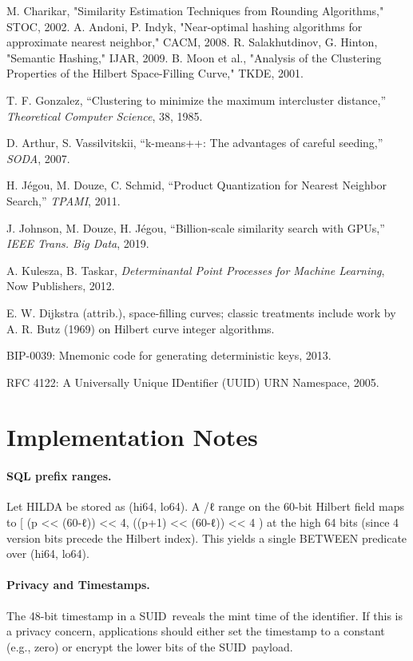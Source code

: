 \documentclass[11pt]{article}
\newcommand{\suid}{\textsc{SUID}}
\begin{document}
\begin{thebibliography}{9}
 M. Charikar, "Similarity Estimation Techniques from Rounding Algorithms," STOC, 2002.
 A. Andoni, P. Indyk, "Near-optimal hashing algorithms for approximate nearest neighbor," CACM, 2008.
 R. Salakhutdinov, G. Hinton, "Semantic Hashing," IJAR, 2009.
 B. Moon et al., "Analysis of the Clustering Properties of the Hilbert Space-Filling Curve," TKDE, 2001.

T. F. Gonzalez, ``Clustering to minimize the maximum intercluster distance,'' \emph{Theoretical Computer Science}, 38, 1985.

D. Arthur, S. Vassilvitskii, ``k-means++: The advantages of careful seeding,'' \emph{SODA}, 2007.

H. Jégou, M. Douze, C. Schmid, ``Product Quantization for Nearest Neighbor Search,'' \emph{TPAMI}, 2011.

J. Johnson, M. Douze, H. Jégou, ``Billion-scale similarity search with GPUs,'' \emph{IEEE Trans. Big Data}, 2019.

A. Kulesza, B. Taskar, \emph{Determinantal Point Processes for Machine Learning}, Now Publishers, 2012.

E. W. Dijkstra (attrib.), space-filling curves; classic treatments include work by A. R. Butz (1969) on Hilbert curve integer algorithms.

BIP-0039: Mnemonic code for generating deterministic keys, 2013.

RFC 4122: A Universally Unique IDentifier (UUID) URN Namespace, 2005.
\end{thebibliography}

\appendix
\section{Implementation Notes}

\paragraph{SQL prefix ranges.}
Let HILDA be stored as (hi64, lo64). A /ℓ range on the 60-bit Hilbert field maps to
[ (p << (60-ℓ)) << 4, ((p+1) << (60-ℓ)) << 4 ) at the high 64 bits (since 4 version bits precede the Hilbert index).
This yields a single BETWEEN predicate over (hi64, lo64).

\paragraph{Privacy and Timestamps.}
The 48-bit timestamp in a \suid\ reveals the mint time of the identifier. If this is a privacy concern, applications should either set the timestamp to a constant (e.g., zero) or encrypt the lower bits of the \suid\ payload.
\end{document}
